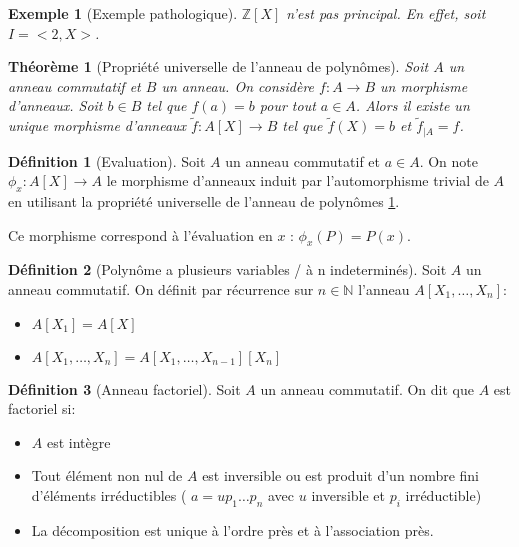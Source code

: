 \documentclass{article}
\theoremstyle{definition}
\newtheorem{definition}{Définition}
\theoremstyle{definition}
\theoremstyle{definition}
\theoremstyle{plain}
\newtheorem{example}{Exemple}
\theoremstyle{theorem}
\newtheorem{theorem}{Théorème}
\begin{document}
\begin{example}[Exemple pathologique]
	$\mathbb{Z}[X]$ n'est pas principal. En effet, soit $I = <2, X>$.
\end{example}

\begin{theorem}[Propriété universelle de l'anneau de polynômes] \label{thm:prop_univ_anneau_poly}
	\label{thm:prop_univ_anneau_poly}
	Soit $A$ un anneau commutatif et $B$ un anneau. On considère $f: A \to B$ un morphisme d'anneaux.
	Soit $b \in B$ tel que $f(a) = b$ pour tout $a \in A$. Alors il existe un unique morphisme d'anneaux
	$\tilde{f}: A[X] \to B$ tel que $\tilde{f}(X) = b$ et $\tilde{f}_{|A} = f$.
\end{theorem}

\begin{definition}[Evaluation]
	Soit $A$ un anneau commutatif et $a \in A$. On note $\phi_x: A[X] \to A$ le morphisme d'anneaux
	induit par l'automorphisme trivial de $A$ en utilisant la propriété universelle de l'anneau de polynômes \ref{thm:prop_univ_anneau_poly}.

	Ce morphisme correspond à l'évaluation en $x$ : $\phi_x(P) = P(x)$.

\end{definition}

\begin{definition}[Polynôme a plusieurs variables / à n indeterminés]
	Soit $A$ un anneau commutatif. On définit par récurrence sur $n \in \mathbb{N}$ l'anneau $A[X_1, \dots, X_n]$:
	\begin{itemize}
		\item $A[X_1] = A[X]$
		\item $A[X_1, \dots, X_n] = A[X_1, \dots, X_{n-1}][X_n]$
	\end{itemize}
\end{definition}


\begin{definition}[Anneau factoriel]
	Soit $A$ un anneau commutatif. On dit que $A$ est factoriel si:
	\begin{itemize}
		\item $A$ est intègre
		\item Tout élément non nul de $A$ est inversible ou est produit d'un nombre fini d'éléments irréductibles ( $a = u p_1 \dots p_n$ avec $u$ inversible et $p_i$ irréductible)
		\item La décomposition est unique à l'ordre près et à l'association près.
	\end{itemize}
\end{definition}
\end{document}
